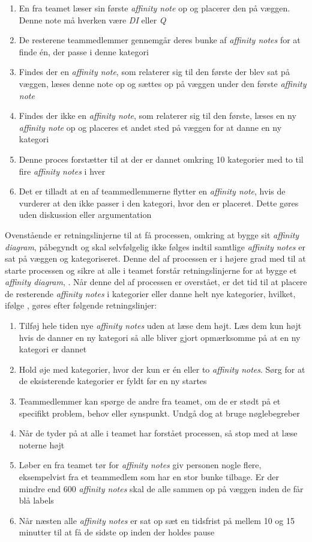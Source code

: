 %
\begin{enumerate}
  \item En fra teamet læser sin første \textit{affinity note} op og placerer den på væggen. Denne note må hverken være \textit{DI} eller \textit{Q}
  \item De resterene teammedlemmer gennemgår deres bunke af \textit{affinity notes} for at finde én, der passe i denne kategori
  \item Findes der en \textit{affinity note}, som relaterer sig til den første der blev sat på væggen, læses denne note op og sættes op på væggen under den første \textit{affinity note}
  \item Findes der ikke en \textit{affinity note}, som relaterer sig til den første, læses en ny \textit{affinity note} op og placeres et andet sted på væggen for at danne en ny kategori
  \item Denne proces forstætter til at der er dannet omkring 10 kategorier med to til fire \textit{affinity notes} i hver
  \item Det er tilladt at en af teammedlemmerne flytter en \textit{affinity note}, hvis de vurderer at den ikke passer i den kategori, hvor den er placeret. Dette gøres uden diskussion eller argumentation\blankline 
\end{enumerate}
%
Ovenstående er retningslinjerne til at få processen, omkring at bygge sit \textit{affinity diagram}, påbegyndt og skal selvfølgelig ikke følges indtil samtlige \textit{affinity notes} er sat på væggen og kategoriseret. Denne del af processen er i højere grad med til at starte processen og sikre at alle i teamet forstår retningslinjerne for at bygge et \textit{affinity diagram}, \parencite[s. 168]{Book:BuildingAnAffinity}. Når denne del af processen er overstået, er det tid til at placere de resterende \textit{affinity notes} i kategorier eller danne helt nye kategorier, hvilket, ifølge \textcite[ss. 168-169]{Book:BuildingAnAffinity}, gøres efter følgende retningslinjer:\blankline
%
\begin{enumerate}
  \item Tilføj hele tiden nye \textit{affinity notes} uden at læse dem højt. Læs dem kun højt hvis de danner en ny kategori så alle bliver gjort opmærksomme på at en ny kategori er dannet
  \item Hold øje med kategorier, hvor der kun er én eller to \textit{affinity notes}. Sørg for at de eksisterende kategorier er fyldt før en ny startes
  \item Teammedlemmer kan spørge de andre fra teamet, om de er stødt på et specifikt problem, behov eller synspunkt. Undgå dog at bruge nøglebegreber
  \item Når de tyder på at alle i teamet har forstået processen, så stop med at læse noterne højt
  \item Løber en fra teamet tør for \textit{affinity notes} giv personen nogle flere, eksempelvist fra et teammedlem som har en stor bunke tilbage. Er der mindre end 600 \textit{affinity notes} skal de alle sammen op på væggen inden de får blå labels
  \item Når næsten alle \textit{affinity notes} er sat op sæt en tidsfrist på mellem 10 og 15 minutter til at få de sidste op inden der holdes pause\blankline
\end{enumerate}
